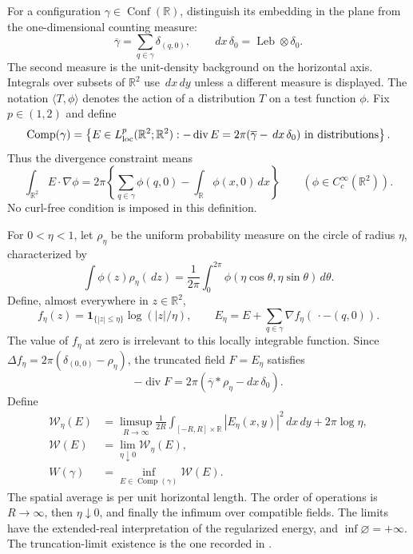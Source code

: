 \documentclass[11pt,reqno]{amsart}
\numberwithin{equation}{section}
\theoremstyle{definition}
\theoremstyle{remark}
\newcommand{\R}{\mathbb R}
\newcommand{\1}{\mathbf 1}
\newcommand{\Conf}{\operatorname{Conf}}
\newcommand{\Leb}{\operatorname{Leb}}
\newcommand{\dd}{\,d}
\DeclareMathOperator{\diver}{div}
\begin{document}
For a configuration $\gamma\in\Conf(\R)$, distinguish its embedding
in the plane from the one-dimensional counting measure:
\[
\overline\gamma=\sum_{q\in\gamma}\delta_{(q,0)},\qquad
\dd x\,\delta_0=\Leb\otimes\delta_0.
\]
The second measure is the unit-density background on the horizontal
axis. Integrals over subsets of $\R^2$ use $\dd x\dd y$ unless a
different measure is displayed. The notation $\langle T,\phi\rangle$
denotes the action of a distribution $T$ on a test function $\phi$.
Fix $p\in(1,2)$ and define
\begin{equation}\label{eq:compatible-fields}
\operatorname{Comp}(\gamma)=
\left\{E\in L^p_{\rm loc}(\R^2;\R^2):
 -\diver E=2\pi(\overline\gamma-\dd x\,\delta_0)
 \text{ in distributions}\right\}.
\end{equation}
Thus the divergence constraint means
\[
\int_{\R^2}E\cdot\nabla\phi
 =2\pi\left\{\sum_{q\in\gamma}\phi(q,0)
                  -\int_\R\phi(x,0)\dd x\right\}
\qquad(\phi\in C_c^\infty(\R^2)).
\]
No curl-free condition is imposed in this definition.

For $0<\eta<1$, let $\rho_\eta$ be the uniform probability measure
on the circle of radius $\eta$, characterized by
\[
\int\phi(z)\rho_\eta(\dd z)
 =\frac1{2\pi}\int_0^{2\pi}
   \phi(\eta\cos\theta,\eta\sin\theta)\dd\theta.
\]
Define, almost everywhere in $z\in\R^2$,
\begin{equation}\label{eq:inner-truncation}
f_\eta(z)=\1_{\{|z|\le\eta\}}\log(|z|/\eta),\qquad
E_\eta=E+\sum_{q\in\gamma}\nabla f_\eta(\,\cdot-(q,0)).
\end{equation}
The value of $f_\eta$ at zero is irrelevant to this locally integrable
function. Since $\Delta f_\eta=2\pi(\delta_{(0,0)}-\rho_\eta)$,
the truncated field $F=E_\eta$ satisfies
\begin{equation}\label{eq:regularized-div}
-\diver F=2\pi(\overline\gamma*\rho_\eta-dx\,\delta_0).
\end{equation}
Define
\begin{equation}\label{eq:renormalized-energy}
\begin{aligned}
\mathcal W_\eta(E)
&=\limsup_{R\to\infty}\frac1{2R}
\int_{[-R,R]\times\R}|E_\eta(x,y)|^2\dd x\dd y
+2\pi\log\eta,\\
\mathcal W(E)&=\lim_{\eta\downarrow0}\mathcal W_\eta(E),\\
W(\gamma)&=\inf_{E\in\operatorname{Comp}(\gamma)}\mathcal W(E).
\end{aligned}
\end{equation}
The spatial average is per unit horizontal length. The order of operations
is $R\to\infty$, then $\eta\downarrow0$, and finally the infimum
over compatible fields. The limits have the extended-real interpretation
of the regularized energy, and $\inf\varnothing=+\infty$. The truncation-limit existence is the one recorded in
\cite[Section~2.7.1]{LS}.
\end{document}
